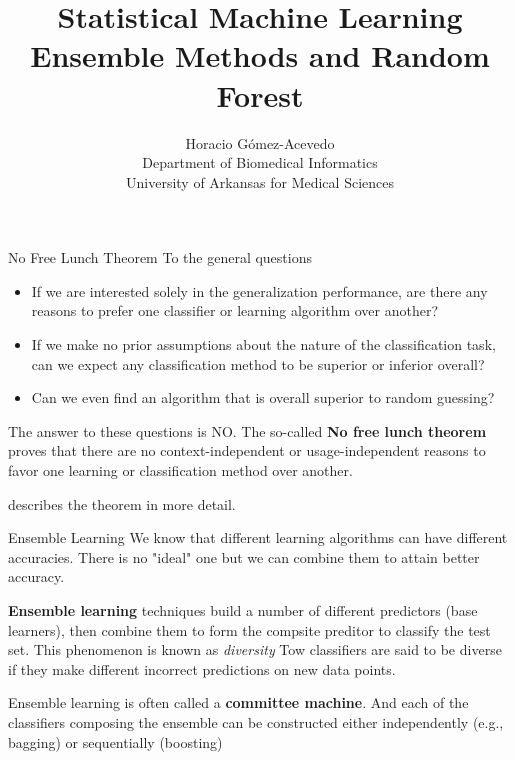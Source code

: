 \documentclass{beamer}
\title{Statistical Machine Learning\\ Ensemble Methods and Random Forest}
\author{Horacio G\'omez-Acevedo\\ Department of Biomedical Informatics\\
University of Arkansas for Medical Sciences}
\begin{document}
	\begin{frame}[plain]
		\maketitle
	\end{frame}

\begin{frame}{No Free Lunch Theorem}
	To the general questions
	\begin{itemize}
		\item If we are interested solely in the generalization performance, are there any reasons to prefer one classifier or learning algorithm over another?
		\item If we make no prior assumptions about the nature of the classification task, can we expect any classification method to be superior or inferior overall?
		\item Can we even find an algorithm that is overall superior to random guessing?
	\end{itemize}
The answer to these questions is NO. The so-called \textbf{No free lunch theorem} proves that there are no context-independent or usage-independent reasons to favor one learning or classification method over another. 

\citep{duda} describes the theorem in more detail. 
\end{frame}

\begin{frame}{Ensemble Learning}
	We know that different learning algorithms can have different accuracies. There is no "ideal" one but we can combine them to attain better accuracy. 
	
	\textbf{Ensemble learning} techniques build a number of different predictors (base learners), then combine them to form the compsite preditor to classify the test set. This phenomenon is known as \textit{diversity} Tow classifiers are said to be diverse if they make different incorrect predictions on new data points. 
	
	Ensemble learning is often called a \textbf{committee machine}. And each of the classifiers composing the ensemble can be constructed either independently (e.g., bagging) or sequentially (boosting)
\end{frame}
\end{document}
